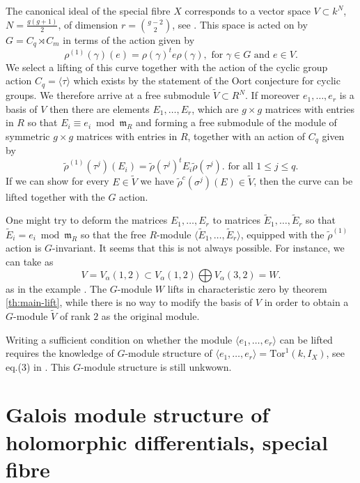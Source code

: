 \documentclass[11pt,letterpaper]{amsart}
\theoremstyle{definition}
\renewcommand{\mod}{\bmod}
\begin{document}
{The canonical ideal of the special fibre $X$ corresponds to a vector space $V \subset k^{N}$, $N=\frac{g(g+1)}{2}$, of dimension $r=\binom{g-2}{2}$, see \cite[remark 8]{2101.11084}. This space is acted on by  $G=C_q \rtimes C_m$  in terms of the action given by
\[
\rho^{(1)}(\gamma) (e)= \rho(\gamma )^t e \rho(\gamma), \text{ for } \gamma \in G \text{ and } e \in V.
\]
We select a lifting of this curve together with the action of the cyclic group action $C_q=\langle \tau \rangle$ which exists by the statement of the Oort conjecture for cyclic groups. 
We therefore arrive at a free submodule $\tilde{V} \subset R^N$. If moreover $e_1, \ldots , e_r$ is a basis of $V$ then there are elements  $E_1, \ldots ,E_r$,  which are $g\times g$ matrices with entries in $R$ so that $E_i \equiv e_i \mod \mathfrak{m}_R$ and  forming a free submodule of the module of symmetric $g\times g$ matrices with entries in $R$, together with an action of $C_q$ given by
\[
    \tilde{\rho}^{(1)}(\tau^j)(E_i) = 
    \tilde{\rho}(\tau^j)^t E_i \tilde{\rho}(\tau^j).
\text{ for all } 1\leq j \leq q.
\]
If we can show for every $E \in \tilde{V}$ we have  $\tilde{\rho}^c(\sigma^j)(E) \in \tilde{V}$, then the curve can be lifted together with the $G$ action. 
 
One might try to deform the matrices $E_1,\ldots, E_r$ to matrices $\tilde{E}_1, \ldots , \tilde{E}_r$ so that $\tilde{E}_i= e_i \mod \mathfrak{m}_R$ so that the free $R$-module $\langle \tilde{E}_1, \ldots , \tilde{E}_r \rangle$, equipped with the $\tilde{\rho}^{(1)}$ action is $G$-invariant. It seems that this is not always possible. For instance, we can take as 
\[
  V=V_{\alpha }(1,2) \subset V_{\alpha }(1,2) \bigoplus
  V_{\alpha }(3,2)=W.
\]
as in the example \cite[p. 777]{MR4779377}. The $G$-module $W$ lifts in characteristic zero by theorem \ref{th:main-lift}, while there is no way to modify the basis of $V$ in order to obtain a $G$-module $\tilde{V}$ of rank $2$ as the original module. 

Writing a sufficient condition on whether the module $\langle e_1, \ldots , e_r \rangle$ can be lifted requires the knowledge of $G$-module structure of 
$\langle e_1, \ldots , e_r\rangle =\mathrm{Tor}^1(k,I_X)$,  see eq.(3) in \cite{2101.11084}. This $G$-module structure is still unkwown. 
}







%
%
%
%
\section{Galois module structure of holomorphic differentials, special fibre}
%
%
%
\label{sec:HolomorphicDifferentialSpecialFibre}
\end{document}

